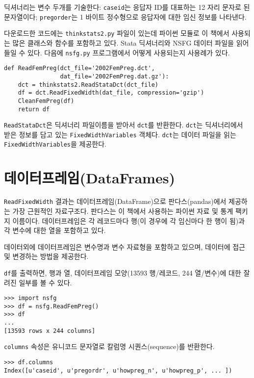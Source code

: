 딕셔너리는 변수 두개를 기술한다: {\tt caseid}는 응답자 ID를 대표하는 12 자리 문자로 된 문자열이다;
 {\tt pregorder}는 1 바이트 정수형으로 응답자에 대한 임신 정보를 나타낸다.

다운로드한 코드에는 {\tt thinkstats2.py} 파일이 있는데 파이썬 모듈로 이 책에서 사용되는 많은 클래스와 함수를 포함하고 있다. 
Stata 딕셔너리와 NSFG 데이터 파일을 읽어 들일 수 있다. 다음에 {\tt nsfg.py} 프로그램에서 어떻게 사용되는지 사용례가 있다.

\begin{verbatim}
def ReadFemPreg(dct_file='2002FemPreg.dct',
                dat_file='2002FemPreg.dat.gz'):
    dct = thinkstats2.ReadStataDct(dct_file)
    df = dct.ReadFixedWidth(dat_file, compression='gzip')
    CleanFemPreg(df)
    return df
\end{verbatim}

{\tt ReadStataDct}은 딕셔너리 파일이름을 받아서 {\tt dct}를 반환한다.
{\tt dct}는 딕셔너리에서 받은 정보를 담고 있는 {\tt FixedWidthVariables} 객체다.
{\tt dct}는 데이터 파일을 읽는 {\tt FixedWidthVariables}을 제공한다.

\section{데이터프레임(DataFrames)}
\label{dataframe}

{\tt ReadFixedWidth} 결과는 데이터프레임(DataFrame)으로 판다스(pandas)에서 제공하는 가장 근원적인 자료구조다. 판다스는 이 책에서 사용하는 파이썬 자료 및 통계 팩키지 이름이다. 데이터프레임은 각 레코드마다 행(이 경우에 각 임신마다 한 행이 됨)과 각 변수에 대한 열을 포함하고 있다. 


데이터외에 데이터프레임은 변수명과 변수 자료형을 포함하고 있으며, 데이터에 접근 및 변경하는 방법을 제공한다. 

{\tt df}를 출력하면, 행과 열, 데이터프레임 모양(13593 행/레코드, 244 열/변수)에 대한 잘려진 일부를 볼 수 있다. 

\begin{verbatim}
>>> import nsfg
>>> df = nsfg.ReadFemPreg()
>>> df
...
[13593 rows x 244 columns]
\end{verbatim}

{\tt columns} 속성은 유니코드 문자열로 칼럼명 시퀀스(sequence)를 반환한다. 

\begin{verbatim}
>>> df.columns
Index([u'caseid', u'pregordr', u'howpreg_n', u'howpreg_p', ... ])
\end{verbatim}

